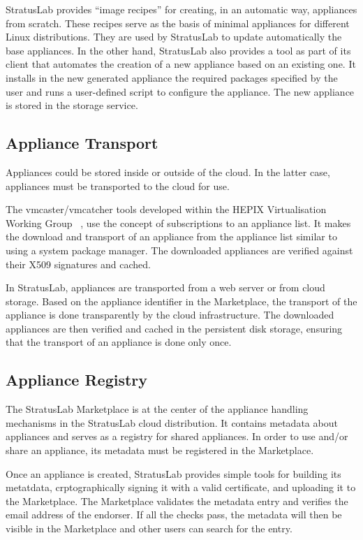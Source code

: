 StratusLab provides ``image recipes'' for creating, in an automatic way, appliances from scratch. 
These recipes serve as the basis of minimal appliances for different
Linux distributions. They are used by StratusLab to update automatically
the base appliances. In the other hand, StratusLab also provides a tool as part of its client that 
automates the creation of a new appliance based on an existing one.
It installs in the new generated appliance the required packages specified by the user and runs a user-defined  
script to configure the appliance.
The new appliance is stored in the storage service.

\subsection{Appliance Transport}

Appliances could be stored inside or outside of the cloud. In the latter case, 
appliances must be transported to the cloud for use.

The vmcaster/vmcatcher tools developed within the HEPIX Virtualisation Working
Group ~\cite{hepixbooktransfer}, use the concept of subscriptions to an 
appliance list. It makes the download and transport of an appliance 
from the appliance list similar to using a system package manager.
The downloaded appliances are
verified against their X509 signatures and cached.

In StratusLab, appliances are transported from a web
server or from cloud storage. Based on the appliance identifier in the Marketplace,
the transport of the appliance is done transparently by the cloud infrastructure.
The downloaded appliances are then verified and cached in the persistent disk storage,
ensuring that the transport of an appliance is done only once.

\subsection{Appliance Registry}

The StratusLab Marketplace is at the center of the appliance handling
mechanisms in the StratusLab cloud distribution. It contains metadata 
about appliances and serves as a registry for shared appliances. 
In order to use and/or share an appliance, its metadata must be registered 
in the Marketplace\@. 

Once an appliance is created, StratusLab provides simple tools for 
building its metatdata, crptographically signing it with a valid
certificate, and uploading it to the Marketplace\@.  The Marketplace
validates the metadata entry and verifies the 
email address of the endorser.  If all the checks pass, 
the metadata will then be visible in the Marketplace and other users 
can search for the entry.
